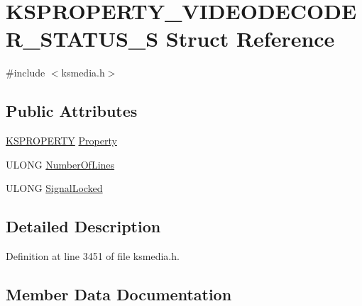 \hypertarget{struct_k_s_p_r_o_p_e_r_t_y___v_i_d_e_o_d_e_c_o_d_e_r___s_t_a_t_u_s___s}{}\section{K\+S\+P\+R\+O\+P\+E\+R\+T\+Y\+\_\+\+V\+I\+D\+E\+O\+D\+E\+C\+O\+D\+E\+R\+\_\+\+S\+T\+A\+T\+U\+S\+\_\+S Struct Reference}
\label{struct_k_s_p_r_o_p_e_r_t_y___v_i_d_e_o_d_e_c_o_d_e_r___s_t_a_t_u_s___s}


{\ttfamily \#include $<$ksmedia.\+h$>$}

\subsection*{Public Attributes}
\begin{DoxyCompactItemize}
\item 
\hyperlink{ks_8h_a4392f77c74e868d813d46c39ada4d660}{K\+S\+P\+R\+O\+P\+E\+R\+TY} \hyperlink{struct_k_s_p_r_o_p_e_r_t_y___v_i_d_e_o_d_e_c_o_d_e_r___s_t_a_t_u_s___s_a3ca07b5de156c20d6dceb9a28827082b}{Property}
\item 
U\+L\+O\+NG \hyperlink{struct_k_s_p_r_o_p_e_r_t_y___v_i_d_e_o_d_e_c_o_d_e_r___s_t_a_t_u_s___s_a2fa5360917133d5bfbbe701708677032}{Number\+Of\+Lines}
\item 
U\+L\+O\+NG \hyperlink{struct_k_s_p_r_o_p_e_r_t_y___v_i_d_e_o_d_e_c_o_d_e_r___s_t_a_t_u_s___s_a7aa74877cdd9b6f014a783bceffcc3a3}{Signal\+Locked}
\end{DoxyCompactItemize}


\subsection{Detailed Description}


Definition at line 3451 of file ksmedia.\+h.



\subsection{Member Data Documentation}
